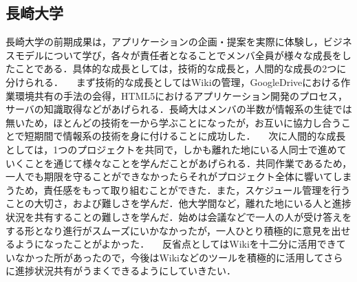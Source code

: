\subsection{長崎大学}
\par
長崎大学の前期成果は，アプリケーションの企画・提案を実際に体験し，ビジネスモデルについて学び，各々が責任者となることでメンバ全員が様々な成長をしたことである．具体的な成長としては，技術的な成長と，人間的な成長の2つに分けられる．
　まず技術的な成長としてはWikiの管理，GoogleDriveにおける作業環境共有の手法の会得，HTML5におけるアプリケーション開発のプロセス，サーバの知識取得などがあげられる．長崎大はメンバの半数が情報系の生徒では無いため，ほとんどの技術を一から学ぶことになったが，お互いに協力し合うことで短期間で情報系の技術を身に付けることに成功した．
　次に人間的な成長としては，1つのプロジェクトを共同で，しかも離れた地にいる人同士で進めていくことを通じて様々なことを学んだことがあげられる．共同作業であるため，一人でも期限を守ることができなかったらそれがプロジェクト全体に響いてしまうため，責任感をもって取り組むことができた．また，スケジュール管理を行うことの大切さ，および難しさを学んだ．他大学間など，離れた地にいる人と進捗状況を共有することの難しさを学んだ．始めは会議などで一人の人が受け答えをする形となり進行がスムーズにいかなかったが，一人ひとり積極的に意見を出せるようになったことがよかった．
　反省点としてはWikiを十二分に活用できていなかった所があったので，今後はWikiなどのツールを積極的に活用してさらに進捗状況共有がうまくできるようにしていきたい．

